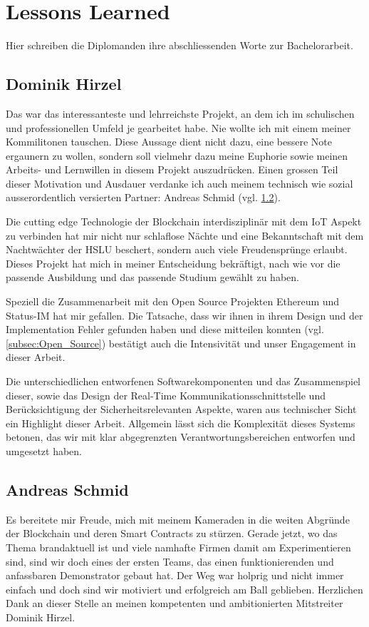 \section{Lessons Learned}
\label{sec:Lessons_Learned}
Hier schreiben die Diplomanden ihre abschliessenden Worte zur Bachelorarbeit.

\subsection{Dominik Hirzel}
Das war das interessanteste und lehrreichste Projekt, an dem ich im schulischen und professionellen Umfeld je gearbeitet habe. Nie wollte ich mit einem meiner Kommilitonen tauschen. Diese Aussage dient nicht dazu, eine bessere Note ergaunern zu wollen, sondern soll vielmehr dazu meine Euphorie sowie meinen Arbeits- und Lernwillen in diesem Projekt auszudrücken. Einen grossen Teil dieser Motivation und Ausdauer verdanke ich auch meinem technisch wie sozial ausserordentlich versierten Partner: Andreas Schmid (vgl. \ref{andi}).

Die cutting edge Technologie der Blockchain interdisziplinär mit dem IoT Aspekt zu verbinden hat mir nicht nur schlaflose Nächte und eine Bekanntschaft mit dem Nachtwächter der HSLU beschert, sondern auch viele Freudensprünge erlaubt. Dieses Projekt hat mich in meiner Entscheidung bekräftigt, nach wie vor die passende Ausbildung und das passende Studium gewählt zu haben.

Speziell die Zusammenarbeit mit den Open Source Projekten Ethereum und Status-IM hat mir gefallen. Die Tatsache, dass wir ihnen in ihrem Design und der Implementation Fehler gefunden haben und diese mitteilen konnten (vgl. \ref{subsec:Open_Source}) bestätigt auch die Intensivität und unser Engagement in dieser Arbeit.

Die unterschiedlichen entworfenen Softwarekomponenten und das Zusammenspiel dieser, sowie das Design der Real-Time Kommunikationsschnittstelle und Berücksichtigung der Sicherheitsrelevanten Aspekte, waren aus technischer Sicht ein Highlight dieser Arbeit. Allgemein lässt sich die Komplexität dieses Systems betonen, das wir mit klar abgegrenzten Verantwortungsbereichen entworfen und umgesetzt haben.

\subsection{Andreas Schmid}
\label{andi}
Es bereitete mir Freude, mich mit meinem Kameraden in die weiten Abgründe der Blockchain und deren Smart Contracts zu stürzen. Gerade jetzt, wo das Thema brandaktuell ist und viele namhafte Firmen damit am Experimentieren sind, sind wir doch eines der ersten Teams, das einen funktionierenden und anfassbaren Demonstrator gebaut hat. Der Weg war holprig und nicht immer einfach und doch sind wir motiviert und erfolgreich am Ball geblieben. Herzlichen Dank an dieser Stelle an meinen kompetenten und ambitionierten Mitstreiter Dominik Hirzel.

